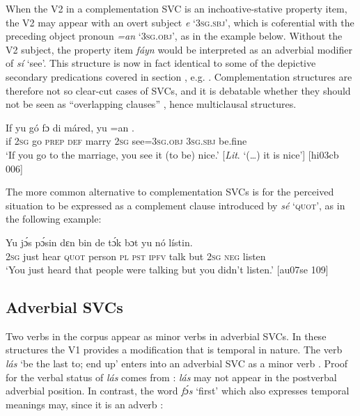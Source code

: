 When the V2 in a complementation SVC is an inchoative-stative property item, the V2 may appear with an overt subject \textit{e} ‘\textsc{3sg.sbj}’, which is coferential with the preceding object pronoun \textit{=an} ‘\textsc{3sg.obj}’, as in the example below. Without the V2 subject, the property item \textit{fáyn} would be interpreted as an adverbial modifier of \textit{sí} ‘see’. This structure is now in fact identical to some of the depictive secondary predications covered in section , e.g. . Complementation structures are therefore not so clear-cut cases of SVCs, and it is debatable whether they should not be seen as “overlapping clauses” \citep{Ameka2006}, hence multiclausal structures. 



\ea%
    \label{ex:key:1578}
    \gll If  yu  gó  fɔ  di  máred,  yu  =an        .\\
if  \textsc{2sg}  go  \textsc{prep}  \textsc{def}  marry  \textsc{2sg}  see=\textsc{3sg.obj}  \textsc{3sg.sbj}  be.fine\\

\glt ‘If you go to the marriage, you see it (to be) nice.’ [\textit{Lit}. ‘(…) it is nice’] [hi03cb 006]
\z

The more common alternative to complementation SVCs is for the perceived situation to be expressed as a complement clause introduced by \textit{sé} ‘\textsc{quot}’, as in the following example: 


\ea%
    \label{ex:key:1579}
    \gll Yu  jɔ́s          pɔ́sin  dɛn  bin  de  tɔ́k  bɔt  yu  nó  lístin.\\
\textsc{2sg}  just  hear    \textsc{quot}    person  \textsc{pl}  \textsc{pst}  \textsc{ipfv}  talk  but  \textsc{2sg}  \textsc{neg}  listen\\

\glt ‘You just heard that people were talking but you didn’t listen.’ [au07se 109]
\z

\subsection{Adverbial SVCs}\label{sec:11.2.5}

Two verbs in the corpus appear as minor verbs in adverbial SVCs. In these structures the V1 provides a modification that is temporal in nature. The verb \textit{lás} ‘be the last to; end up’ enters into an adverbial SVC as a minor verb . Proof for the verbal status of \textit{lás} comes from : \textit{lás} may not appear in the postverbal adverbial position. In contrast, the word \textit{fɔ́s} ‘first’ which also expresses temporal meanings may, since it is an adverb : 



